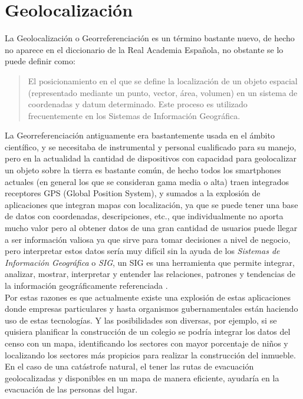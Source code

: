 \section{Geolocalización} %

  La Geolocalización o Georreferenciación es un término bastante nuevo, de hecho no aparece en el diccionario de la Real Academia Española, no obstante se lo puede definir como:

  \begin{quote}
    El posicionamiento en el que se define la localización de un objeto espacial (representado mediante un punto, vector, área, volumen) en un sistema de coordenadas y datum determinado. Este proceso es utilizado frecuentemente en los Sistemas de Información Geográfica.\cite{Georreferenciacion}
  \end{quote}


  La Georreferenciación antiguamente era bastantemente usada en el ámbito científico, y se necesitaba de instrumental y personal cualificado para su manejo, pero en la actualidad la cantidad de dispositivos con capacidad para geolocalizar un objeto sobre la tierra es bastante común, de hecho todos los smartphones actuales (en general los que se consideran gama media o alta) traen integrados receptores GPS (Global Position System), y sumados a la explosión de aplicaciones  que integran mapas con localización, ya que se puede tener una base de datos con coordenadas, descripciones, etc., que individualmente no aporta mucho valor pero al obtener datos de una gran cantidad de usuarios puede llegar a ser información valiosa ya que sirve para tomar decisiones a nivel de negocio, pero interpretar estos datos sería muy difícil sin la ayuda de los \emph{Sistemas de Información Geográfica} o \emph{SIG}, un SIG es una herramienta que permite integrar, analizar, mostrar, interpretar y  entender las relaciones, patrones y tendencias de la información geográficamente referenciada . \cite{what_is_gis} \\

  Por estas razones es que actualmente existe una explosión de estas aplicaciones donde empresas particulares y hasta organismos gubernamentales están haciendo uso de estas tecnologías.
  Y las posibilidades son diversas, por ejemplo, si se quisiera planificar la construcción de un colegio se podría integrar los datos del censo con un mapa, identificando los sectores con mayor porcentaje de niños y localizando los sectores más propicios para realizar la construcción del inmueble. En el caso de una catástrofe natural, el tener las rutas de evacuación geolocalizadas y disponibles en un mapa de manera eficiente,  ayudaría en la evacuación de las personas del lugar.\\

